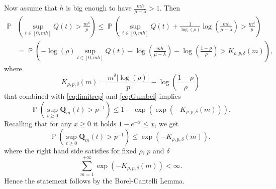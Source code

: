 \documentclass[]{amsart}
\numberwithin{equation}{section}
\theoremstyle{remark}
\theoremstyle{definition}
\DeclareMathOperator{\bP}{\mathbb{P}}
\begin{document}
Now assume that $h$ is big enough to have $\frac{mh}{\mu-\lambda}>1$. Then
\begin{align*}
	\bP&\left(\sup_{t \in [0,mh]}Q(t)>\frac{m^{\delta}}{p}\right) \le \bP\left(\sup_{t \in [0,mh]}Q(t)+\frac{1}{\log(\rho)}\log\left(\frac{mh}{\mu-\lambda}\right)>\frac{m^{\delta}}{p}\right)\\
	&=\bP\left(-\log(\rho)\sup_{t \in [0,mh]}Q(t)-\log\left(\frac{mh}{\mu-\lambda}\right)-\log\left(\frac{1-\rho}{\rho}\right)>K_{\rho,p,\delta}(m)\right),
\end{align*}
where
\begin{equation*}
	K_{\rho,p,\delta}(m)=\frac{m^{\delta}|\log(\rho)|}{p}-\log\left(\frac{1-\rho}{\rho}\right)
\end{equation*}
that combined with \eqref{eq:limitrep} and \eqref{eq:Gumbel} implies
\begin{equation*}
	\bP\left(\sup_{t \ge 0}\mathbf{Q}_m(t)>p^{-1}\right) \le 1-\exp\left(\exp\left(-K_{\rho,p,\delta}(m)\right)\right).
\end{equation*}
Recalling that for any $x \ge 0$ it holds $1-e^{-x} \le x$, we get
\begin{equation*}
	\bP\left(\sup_{t \ge 0}\mathbf{Q}_m(t)>p^{-1}\right) \le \exp\left(-K_{\rho,p,\delta}(m)\right),
\end{equation*}
where the right hand side satisfies for fixed $\rho$, $p$ and $\delta$
\begin{equation*}
	\sum_{m=1}^{+\infty}\exp\left(-K_{\rho,p,\delta}(m)\right)<\infty.
\end{equation*}
Hence the statement follows by the Borel-Cantelli Lemma.
\end{document}
